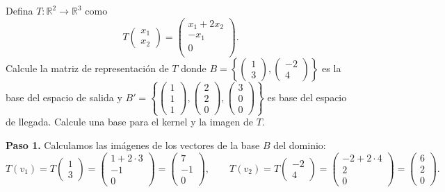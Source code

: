 \begin{example}\label{ex:tl_bases_no_canonicas}
Defina $T: \mathbb{R}^2 \rightarrow \mathbb{R}^3$ como
\[
T\begin{pmatrix}
 x_1\\x_2
\end{pmatrix}=\begin{pmatrix}
x_1+2x_2 \\
	-x_1 \\
	0\\
\end{pmatrix}.
\]
Calcule la matriz de representación de $T$ donde $B=\left\lbrace \begin{pmatrix} 1 \\ 3 \end{pmatrix}, \begin{pmatrix} -2 \\ 4 \end{pmatrix} \right\rbrace$ es la base del espacio de salida y $B'=\left\lbrace \begin{pmatrix} 1 \\ 1 \\ 1 \end{pmatrix}, \begin{pmatrix} 2 \\ 2 \\ 0 \end{pmatrix}, \begin{pmatrix} 3 \\ 0 \\ 0 \end{pmatrix} \right\rbrace$ es base del espacio de llegada. Calcule una base para el kernel y la imagen de $T$.
\begin{myproof}
\textbf{Paso 1.} Calculamos las imágenes de los vectores de la base $B$ del dominio:
\[
T(v_1) = T\begin{pmatrix} 1 \\ 3 \end{pmatrix} = \begin{pmatrix} 1 + 2 \cdot 3 \\ -1 \\ 0 \end{pmatrix} = \begin{pmatrix} 7 \\ -1 \\ 0 \end{pmatrix},
\qquad
T(v_2) = T\begin{pmatrix} -2 \\ 4 \end{pmatrix} = \begin{pmatrix} -2 + 2 \cdot 4 \\ 2 \\ 0 \end{pmatrix} = \begin{pmatrix} 6 \\ 2 \\ 0 \end{pmatrix}.
\]


\end{myproof}
\end{example}
